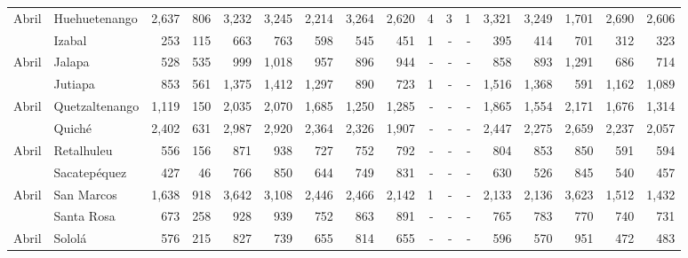 \begin{landscape}
\begin{center}
\begin{longtable}{llrrrrrrrrrrrrrrr}
			\multicolumn{1}{l}{	\footnotesize	 Abril 	}&	 Huehuetenango 	&	 2,637 	&	 806 	&	 3,232 	&	 3,245 	&	 2,214 	&	 3,264 	&	 2,620 	&	 4 	&	 3 	&	 1 	&	 3,321 	&	 3,249 	&	 1,701 	&	 2,690 	&	 2,606 	\\
			\rowcolor{color1!5!white}\multicolumn{1}{l}{	\footnotesize	 Abril 	}&	 Izabal 	&	 253 	&	 115 	&	 663 	&	 763 	&	 598 	&	 545 	&	 451 	&	 1 	&	 -   	&	 -   	&	 395 	&	 414 	&	 701 	&	 312 	&	 323 	\\
			\multicolumn{1}{l}{	\footnotesize	 Abril 	}&	 Jalapa 	&	 528 	&	 535 	&	 999 	&	 1,018 	&	 957 	&	 896 	&	 944 	&	 -   	&	 -   	&	 -   	&	 858 	&	 893 	&	 1,291 	&	 686 	&	 714 	\\
			\rowcolor{color1!5!white}\multicolumn{1}{l}{	\footnotesize	 Abril 	}&	 Jutiapa 	&	 853 	&	 561 	&	 1,375 	&	 1,412 	&	 1,297 	&	 890 	&	 723 	&	 1 	&	 -   	&	 -   	&	 1,516 	&	 1,368 	&	 591 	&	 1,162 	&	 1,089 	\\
			\multicolumn{1}{l}{	\footnotesize	 Abril 	}&	 Quetzaltenango 	&	 1,119 	&	 150 	&	 2,035 	&	 2,070 	&	 1,685 	&	 1,250 	&	 1,285 	&	 -   	&	 -   	&	 -   	&	 1,865 	&	 1,554 	&	 2,171 	&	 1,676 	&	 1,314 	\\
			\rowcolor{color1!5!white}\multicolumn{1}{l}{	\footnotesize	 Abril 	}&	 Quiché 	&	 2,402 	&	 631 	&	 2,987 	&	 2,920 	&	 2,364 	&	 2,326 	&	 1,907 	&	 -   	&	 -   	&	 -   	&	 2,447 	&	 2,275 	&	 2,659 	&	 2,237 	&	 2,057 	\\
			\multicolumn{1}{l}{	\footnotesize	 Abril 	}&	 Retalhuleu 	&	 556 	&	 156 	&	 871 	&	 938 	&	 727 	&	 752 	&	 792 	&	 -   	&	 -   	&	 -   	&	 804 	&	 853 	&	 850 	&	 591 	&	 594 	\\
			\rowcolor{color1!5!white}\multicolumn{1}{l}{	\footnotesize	 Abril 	}&	 Sacatepéquez 	&	 427 	&	 46 	&	 766 	&	 850 	&	 644 	&	 749 	&	 831 	&	 -   	&	 -   	&	 -   	&	 630 	&	 526 	&	 845 	&	 540 	&	 457 	\\
			\multicolumn{1}{l}{	\footnotesize	 Abril 	}&	 San Marcos 	&	 1,638 	&	 918 	&	 3,642 	&	 3,108 	&	 2,446 	&	 2,466 	&	 2,142 	&	 1 	&	 -   	&	 -   	&	 2,133 	&	 2,136 	&	 3,623 	&	 1,512 	&	 1,432 	\\
			\rowcolor{color1!5!white}\multicolumn{1}{l}{	\footnotesize	 Abril 	}&	 Santa Rosa 	&	 673 	&	 258 	&	 928 	&	 939 	&	 752 	&	 863 	&	 891 	&	 -   	&	 -   	&	 -   	&	 765 	&	 783 	&	 770 	&	 740 	&	 731 	\\
			\multicolumn{1}{l}{	\footnotesize	 Abril 	}&	 Sololá 	&	 576 	&	 215 	&	 827 	&	 739 	&	 655 	&	 814 	&	 655 	&	 -   	&	 -   	&	 -   	&	 596 	&	 570 	&	 951 	&	 472 	&	 483 	\\

\end{longtable}
\end{center}
\end{landscape}
